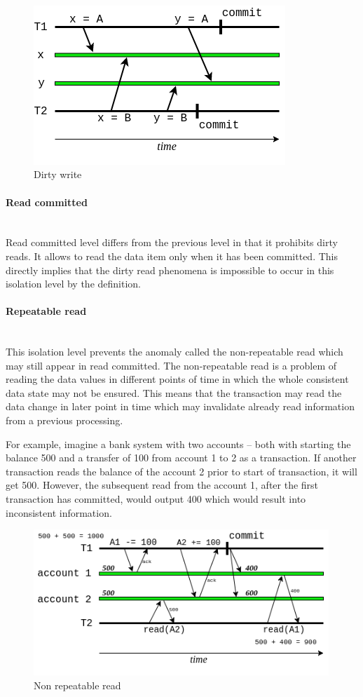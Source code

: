 \documentclass[oneside,
  digital, %
  table,   %
  lof,     %
  lot,     %
]{fithesis3}
\newcommand{\newlinepar}[1]{\paragraph{#1}\needspace{4\baselineskip}\mbox{}\\}
\begin{document}
\hfill \break

\begin{figure}[h]
    \begin{center}
        \includegraphics[height=60mm]{images/dirtywrite.png}
    \end{center}
    \caption{Dirty write}
\end{figure}


\newlinepar{Read committed}

Read committed level differs from the previous level in that it prohibits dirty reads. It allows to read the data item only when it has been committed. This directly implies that the dirty read phenomena is impossible to occur in this isolation level by the definition.


\newlinepar{Repeatable read}

This isolation level prevents the anomaly called the non-repeatable read which may still appear in read committed. The non-repeatable read is a problem of reading the data values in different points of time in which the whole consistent data state may not be ensured. This means that the transaction may read the data change in later point in time which may invalidate already read information from a previous processing.

For example, imagine a bank system with two accounts -- both with starting the balance 500 and a transfer of 100 from account 1 to 2 as a transaction. If another transaction reads the balance of the account 2 prior to start of transaction, it will get 500. However, the subsequent read from the account 1, after the first transaction has committed, would output 400 which would result into inconsistent information.

\begin{figure}[h]
    \begin{center}
        \includegraphics[height=55mm]{images/nonrepeatableread.png}
    \end{center}
    \caption{Non repeatable read}
\end{figure}
\end{document}
